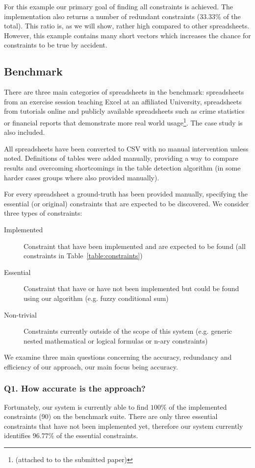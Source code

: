 \documentclass{IEEEtran}
\theoremstyle{definition}
\begin{document}
For this example our primary goal of finding all constraints is achieved.
The implementation also returns a number of redundant constraints ($33.33\%$ of the total).
This ratio is, as we will show, rather high compared to other spreadsheets.
However, this example contains many short vectors which increases the chance for constraints to be true by accident.

\subsection{Benchmark}
There are three main categories of spreadsheets in the benchmark: spreadsheets from an exercise session teaching Excel at an affiliated University, spreadsheets from tutorials online and publicly available spreadsheets such as crime statistics or financial reports that demonstrate more real world usage\footnote{(attached to to the submitted paper)}.
The case study is also included.

All spreadsheets have been converted to CSV with no manual intervention unless noted.
Definitions of tables were added manually, providing a way to compare results and overcoming shortcomings in the table detection algorithm (in some harder cases groups where also provided manually).

For every spreadsheet a ground-truth has been provided manually, specifying the essential (or original) constraints that are expected to be discovered.
We consider three types of constraints:
\begin{description}
  \item[Implemented] Constraint that have been implemented and are expected to be found (all constraints in Table~\ref{table:constraints})
  \item[Essential] Constraint that have or have not been implemented but could be found using our algorithm (e.g. fuzzy conditional sum)
  \item[Non-trivial] Constraints currently outside of the scope of this system (e.g. generic nested mathematical or logical formulas or n-ary constraints)
\end{description}

We examine three main questions concerning the accuracy, redundancy and efficiency of our approach, our main focus being accuracy.

\subsubsection*{Q1. How accurate is the approach?}
Fortunately, our system is currently able to find $100\%$ of the implemented constraints (90) on the benchmark suite.
There are only three essential constraints that have not been implemented yet, therefore our system currently identifies $96.77\%$ of the essential constraints.
\end{document}
